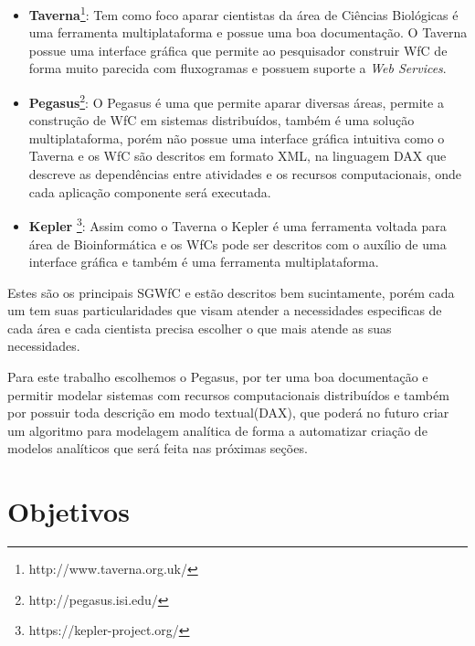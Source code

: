 \documentclass[a4paper,10pt]{article}
\begin{document}
	\begin{itemize}
	
		\item \textbf{Taverna}\footnote{http://www.taverna.org.uk/}: Tem como foco aparar cientistas da área de Ciências Biológicas é uma ferramenta multiplataforma e possue uma boa documentação. O Taverna possue uma interface gráfica que permite ao pesquisador construir WfC de forma muito parecida com fluxogramas e possuem suporte a \textit{Web Services}.

		\item \textbf{Pegasus}\footnote{http://pegasus.isi.edu/}: O Pegasus é uma que permite aparar diversas áreas, permite a construção de WfC em sistemas distribuídos, também é uma solução multiplataforma, porém não possue uma interface gráfica intuitiva como o Taverna e os WfC são descritos em formato XML, na linguagem DAX que descreve as dependências entre atividades e os recursos computacionais, onde cada aplicação componente será executada.

		\item \textbf{Kepler} \footnote{https://kepler-project.org/}: Assim como o Taverna o Kepler é uma ferramenta voltada para área de Bioinformática e os WfCs pode ser descritos com o auxílio de uma interface gráfica e também é uma ferramenta multiplataforma.

	\end{itemize}
	
	Estes são os principais SGWfC e estão descritos bem sucintamente, porém cada um tem suas particularidades que visam atender a necessidades especificas de cada área e cada cientista precisa escolher o que mais atende as suas necessidades. 

			
	
	Para este trabalho escolhemos o Pegasus, por ter uma boa documentação e permitir modelar sistemas com recursos computacionais distribuídos e também por possuir toda descrição em modo textual(DAX), que poderá no futuro criar um algoritmo para modelagem analítica de forma a automatizar criação de modelos analíticos que será feita nas próximas seções.

\section*{Objetivos}
\end{document}
